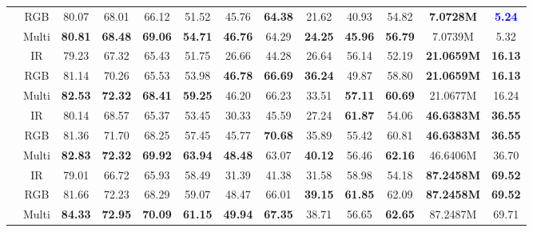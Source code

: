 \begin{table*}[htpb]
{\begin{tabular}{c|c|c|c|c|c|c|c|c|c|c|c|c}
		& RGB        & 80.07          & 68.01          & 66.12          & 51.52          & 45.76          & \textbf{64.38} & 21.62          & 40.93          & 54.82          & \textbf{7.0728M}  & \textbf{\textcolor{blue}{5.24}} \\
		& Multi & \textbf{80.81} & \textbf{68.48} & \textbf{69.06} & \textbf{54.71} & \textbf{46.76} & 64.29          & \textbf{24.25} & \textbf{45.96} & \textbf{56.79} & 7.0739M        & 5.32 \\
		\midrule
		\textbf{\multirow{3}{*}{YOLOv5m \cite{yolov5}} }& IR         & 79.23          & 67.32          & 65.43          & 51.75          & 26.66          & 44.28          & 26.64          & 56.14          & 52.19    &\textbf{21.0659M} &\textbf{16.13}      \\
		& RGB        & 81.14          & 70.26          & 65.53          & 53.98          & \textbf{46.78} & \textbf{66.69} & \textbf{36.24} & 49.87          & 58.80     &\textbf{21.0659M} &\textbf{16.13}     \\
		& Multi & \textbf{82.53} & \textbf{72.32} & \textbf{68.41} & \textbf{59.25} & 46.20          & 66.23          & 33.51          & \textbf{57.11} & \textbf{60.69}  & 21.0677M  & 16.24 \\
		\midrule
		\textbf{\multirow{3}{*}{YOLOv5l \cite{yolov5}}} & IR         & 80.14          & 68.57          & 65.37          & 53.45          & 30.33          & 45.59          & 27.24          & \textbf{61.87} & 54.06     &\textbf{46.6383M} &\textbf{36.55}     \\
		& RGB        & 81.36          & 71.70          & 68.25          & 57.45          & 45.77          & \textbf{70.68} & 35.89          & 55.42          & 60.81    &\textbf{46.6383M} &\textbf{36.55}      \\
		& Multi & \textbf{82.83} & \textbf{72.32} & \textbf{69.92} & \textbf{63.94} & \textbf{48.48} & 63.07          & \textbf{40.12} & 56.46          & \textbf{62.16} &46.6406M &36.70 \\
		\midrule
		\textbf{\multirow{3}{*}{YOLOv5x \cite{yolov5}} }& IR         & 79.01          & 66.72          & 65.93          & 58.49          & 31.39          & 41.38          & 31.58          & 58.98          & 54.18     &\textbf{87.2458M} &\textbf{69.52}     \\
		& RGB        & 81.66          & 72.23          & 68.29          & 59.07          & 48.47          & 66.01          & \textbf{39.15} & \textbf{61.85} & 62.09        &\textbf{87.2458M} &\textbf{69.52}   \\
		& Multi & \textbf{84.33} & \textbf{72.95} & \textbf{70.09} & \textbf{61.15} & \textbf{49.94} & \textbf{67.35} & 38.71          & 56.65          & \textbf{62.65} & 87.2487M &69.71\\

\end{tabular}}
\end{table*}
